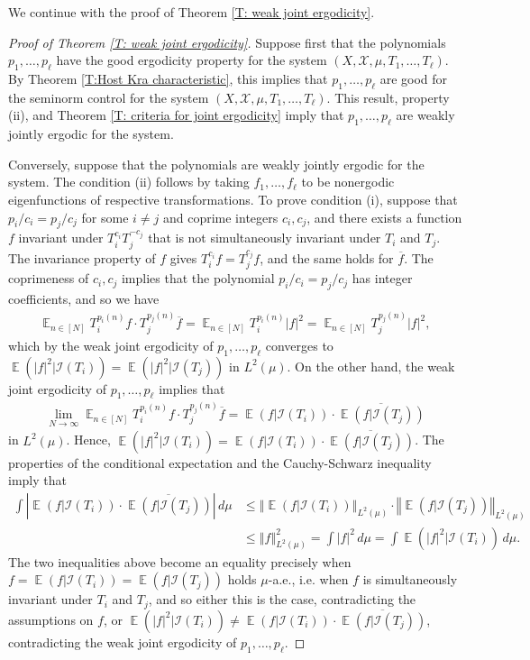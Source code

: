 \documentclass[11pt]{amsart}
\theoremstyle{definition}
\newcommand{\CI}{{\mathcal I}}
\newcommand{\CX}{{\mathcal X}}
\newcommand{\norm}[1]{\left\Vert #1\right\Vert}
\DeclareMathOperator*{\E}{\mathbb{E}}
\newcommand{\abs}[1]{\mathopen{}\left| #1\mathclose{}\right|}
\begin{document}
We continue with the proof of Theorem \ref{T: weak joint ergodicity}.

\begin{proof}[Proof of Theorem \ref{T: weak joint ergodicity}]
Suppose first that the polynomials $p_1, \ldots, p_\ell$ have the good ergodicity property for the system $(X, \CX, \mu, T_1, \ldots, T_\ell)$. By Theorem \ref{T:Host Kra characteristic}, this implies that $p_1, \ldots, p_\ell$ are good for the seminorm control for the system $(X, \CX, \mu, T_1, \ldots, T_\ell)$. This result, property (ii), and Theorem \ref{T: criteria for joint ergodicity} imply that $p_1, \ldots, p_\ell$ are weakly jointly ergodic for the system.

Conversely, suppose that the polynomials are weakly jointly ergodic for the system. The condition (ii) follows by taking $f_1, \ldots, f_\ell$ to be nonergodic eigenfunctions of respective transformations. To prove condition (i), suppose that $p_i/c_i = p_j/c_j$ for some $i\neq j$ and coprime integers $c_i, c_j$, and there exists a function $f$ invariant under $T_i^{c_i}T_j^{-c_j}$ that is not simultaneously invariant under $T_i$ and $T_j$. The invariance property of $f$ gives $T_i^{c_i} f = T_j^{c_j}{f}$, and the same holds for $\overline{f}$. The coprimeness of $c_i, c_j$ implies that the polynomial $p_i/c_i = p_j/c_j$ has integer coefficients, and so we have
\begin{align*}
    \E_{n\in[N]}T_i^{p_i(n)}f \cdot T_j^{p_j(n)}\overline{f} = \E_{n\in[N]} T_i^{p_i(n)}|f|^2 = \E_{n\in[N]} T_j^{p_j(n)}|f|^2,
\end{align*}
which by the weak joint ergodicity of $p_1, \ldots, p_\ell$ converges to $\E(|f|^2|\CI(T_i)) = \E(|f|^2|\CI(T_j))$ in $L^2(\mu)$. On the other hand, the weak joint ergodicity of $p_1, \ldots, p_\ell$  implies that
\begin{align*}
    \lim_{N\to\infty}\E_{n\in[N]}T_i^{p_i(n)}f \cdot T_j^{p_j(n)}\overline{f} = \E(f|\CI(T_i))\cdot \overline{\E(f|\CI(T_j))}
\end{align*}
in $L^2(\mu)$. Hence, $\E(|f|^2|\CI(T_i)) = \E(f|\CI(T_i))\cdot \overline{\E(f|\CI(T_j))}$. The properties of the conditional expectation and the Cauchy-Schwarz inequality imply that
\begin{align*}
    \int \abs{\E(f|\CI(T_i))\cdot \overline{\E(f|\CI(T_j))}}\, d\mu &\leq \norm{\E(f|\CI(T_i))}_{L^2(\mu)} \cdot \norm{\E(f|\CI(T_j))}_{L^2(\mu)}\\
    &\leq \norm{f}_{L^2(\mu)}^2 = \int |f|^2\, d\mu = \int \E(|f|^2|\CI(T_i))\, d\mu.
\end{align*}
The two inequalities above become an equality precisely when $f = \E(f|\CI(T_i)) = \E(f|\CI(T_j))$ holds $\mu$-a.e., i.e. when $f$ is simultaneously invariant under $T_i$ and $T_j$, and so either this is the case, contradicting the assumptions on $f$, or $\E(|f|^2|\CI(T_i)) \neq \E(f|\CI(T_i))\cdot \overline{\E(f|\CI(T_j))}$, contradicting the weak joint ergodicity of $p_1, \ldots, p_\ell$.
\end{proof}
\end{document}
